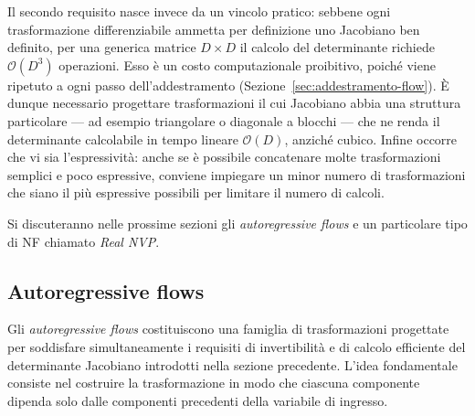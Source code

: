 Il secondo requisito nasce invece da un vincolo pratico: sebbene ogni trasformazione differenziabile ammetta per definizione uno Jacobiano ben definito, per una generica matrice $D \times D$ il calcolo del determinante richiede $\mathcal{O}(D^3)$ operazioni. Esso è un costo computazionale proibitivo, poiché viene ripetuto a ogni passo dell'addestramento (Sezione~\ref{sec:addestramento-flow}). È dunque necessario progettare trasformazioni il cui Jacobiano abbia una struttura particolare — ad esempio triangolare o diagonale a blocchi — che ne renda il determinante calcolabile in tempo lineare $\mathcal{O}(D)$, anziché cubico. Infine occorre che vi sia l'espressività: anche se è possibile concatenare molte trasformazioni semplici e poco espressive, conviene impiegare un minor numero di trasformazioni che siano il più espressive possibili per limitare il numero di calcoli.

Si discuteranno nelle prossime sezioni gli \emph{autoregressive flows} e un particolare tipo di NF chiamato \emph{Real NVP}.

\subsection{Autoregressive flows}

Gli \emph{autoregressive flows} costituiscono una famiglia di trasformazioni progettate per soddisfare simultaneamente i requisiti di invertibilità e di calcolo efficiente del determinante Jacobiano introdotti nella sezione precedente. L'idea fondamentale consiste nel costruire la trasformazione in modo che ciascuna componente dipenda solo dalle componenti precedenti della variabile di ingresso.

